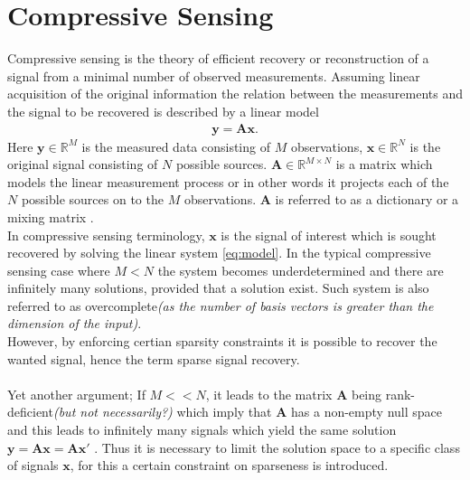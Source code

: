 \section{Compressive Sensing}\label{sec:CS}
Compressive sensing is the theory of efficient recovery or reconstruction of a signal from a minimal number of observed measurements. Assuming linear acquisition of the original information the relation between the measurements and the signal to be recovered is described by a linear model\cite{FR} 
\begin{align}\label{eq:model}
\mathbf{y} = \mathbf{Ax}.
\end{align}
Here $\mathbf{y} \in \mathbb{R}^M$ is the measured data consisting of $M$ observations, $\mathbf{x} \in \mathbb{R}^N$ is the original signal consisting of $N$ possible sources. $\mathbf{A} \in \mathbb{R}^{M \times N}$ is a matrix which models the linear measurement process or in other words it projects each of the $N$ possible sources on to the $M$ observations. $\textbf{A}$ is  referred to as a dictionary or a mixing matrix .\\
In compressive sensing terminology, $\mathbf{x}$ is the signal of interest which is sought recovered by solving the linear system \eqref{eq:model}. In the typical compressive sensing case where $M < N$ the system becomes underdetermined and there are infinitely many solutions, provided that a solution exist. Such system is also referred to as overcomplete\textit{(as the number of basis vectors is greater than the dimension of the input)}.\\
However, by enforcing certian sparsity constraints it is possible to recover the wanted signal\cite{FR}, hence the term sparse signal recovery. \\ 
\\ 
Yet another argument; If $M<<N$, it leads to the matrix $\mathbf{A}$ being rank-deficient\textit{(but not necessarily?)} which imply that $\mathbf{A}$ has a non-empty null space and this leads to infinitely many signals which yield the same solution $\mathbf{y} = \mathbf{Ax} = \mathbf{Ax'}$ \cite[p. ix]{CS}. Thus it is necessary to limit the solution space to a specific class of signals $\mathbf{x}$, for this a certain constraint on sparseness is introduced.   

